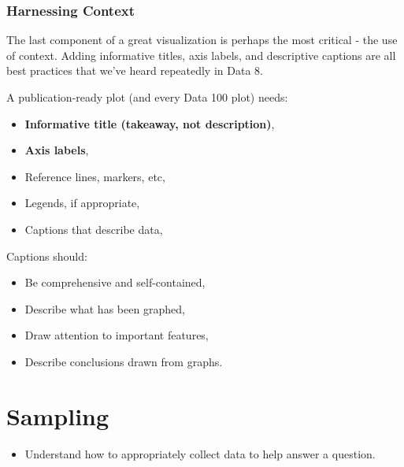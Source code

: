 \documentclass[
  letterpaper,
  DIV=11,
  numbers=noendperiod]{scrreprt}
\providecommand{\tightlist}{%
  \setlength{\itemsep}{0pt}\setlength{\parskip}{0pt}}\usepackage{longtable,booktabs,array}
\begin{document}
\subsection{Harnessing Context}\label{harnessing-context}

The last component of a great visualization is perhaps the most critical
- the use of context. Adding informative titles, axis labels, and
descriptive captions are all best practices that we've heard repeatedly
in Data 8.

A publication-ready plot (and every Data 100 plot) needs:

\begin{itemize}
\tightlist
\item
  \textbf{Informative title (takeaway, not description)},
\item
  \textbf{Axis labels},
\item
  Reference lines, markers, etc,
\item
  Legends, if appropriate,
\item
  Captions that describe data,
\end{itemize}

Captions should:

\begin{itemize}
\tightlist
\item
  Be comprehensive and self-contained,
\item
  Describe what has been graphed,
\item
  Draw attention to important features,
\item
  Describe conclusions drawn from graphs.
\end{itemize}


\chapter{Sampling}\label{sampling}

\begin{tcolorbox}[enhanced jigsaw, arc=.35mm, left=2mm, toprule=.15mm, leftrule=.75mm, bottomrule=.15mm, colframe=quarto-callout-note-color-frame, rightrule=.15mm, colbacktitle=quarto-callout-note-color!10!white, opacitybacktitle=0.6, coltitle=black, bottomtitle=1mm, colback=white, toptitle=1mm, title=\textcolor{quarto-callout-note-color}{\faInfo}\hspace{0.5em}{Learning Outcomes}, breakable, opacityback=0, titlerule=0mm]

\begin{itemize}
\tightlist
\item
  Understand how to appropriately collect data to help answer a
  question.
\end{itemize}

\end{tcolorbox}
\end{document}
